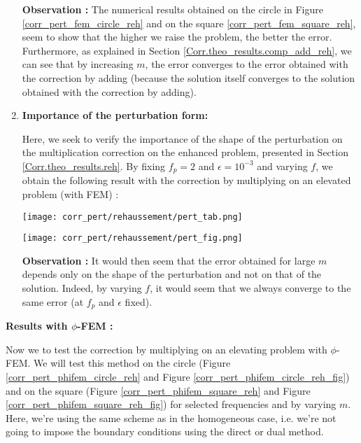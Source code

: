 \begin{enumerate}[label=\textbullet]
	\textbf{Observation :} The numerical results obtained on the circle in Figure \ref{corr_pert_fem_circle_reh} and on the square \ref{corr_pert_fem_square_reh}, seem to show that the higher we raise the problem, the better the error. Furthermore, as explained in Section \ref{Corr.theo_results.comp_add_reh}, we can see that by increasing $m$, the error converges to the error obtained with the correction by adding (because the solution itself converges to the solution obtained with the correction by adding). 
	
	\item \textbf{Importance of the perturbation form:}
	
	Here, we seek to verify the importance of the shape of the perturbation on the multiplication correction on the enhanced problem, presented in Section \ref{Corr.theo_results.reh}. By fixing $f_p = 2$ and $\epsilon=10^{-3}$ and varying $f$, we obtain the following result with the correction by multiplying on an elevated problem (with FEM) :
	\begin{minipage}{0.58\linewidth}
		\centering
		\texttt{[image: corr\_pert/rehaussement/pert\_tab.png]}
	\end{minipage} \;
	\begin{minipage}{0.38\linewidth}
		\centering
		\texttt{[image: corr\_pert/rehaussement/pert\_fig.png]}
	\end{minipage}

	\textbf{Observation :} It would then seem that the error obtained for large $m$ depends only on the shape of the perturbation and not on that of the solution. Indeed, by varying $f$, it would seem that we always converge to the same error (at $f_p$ and $\epsilon$ fixed).
\end{enumerate}


\textbf{Results with $\phi$-FEM :}

Now we to test the correction by multiplying on an elevating problem with $\phi$-FEM. We will test this method on the circle (Figure \ref{corr_pert_phifem_circle_reh} and Figure \ref{corr_pert_phifem_circle_reh_fig}) and on the square (Figure \ref{corr_pert_phifem_square_reh} and Figure \ref{corr_pert_phifem_square_reh_fig}) for selected frequencies and by varying $m$. Here, we're using the same scheme as in the homogeneous case, i.e. we're not going to impose the boundary conditions using the direct or dual method. 

